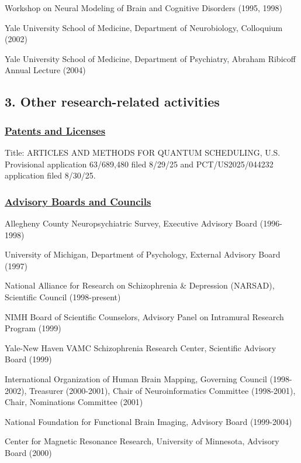 \documentclass[10 pt]{article}
\begin{document}
Workshop on Neural Modeling of Brain and Cognitive Disorders (1995, 1998)

Yale University School of Medicine, Department of Neurobiology, Colloquium (2002)

Yale University School of Medicine, Department of Psychiatry, Abraham Ribicoff Annual Lecture (2004)


\subsection*{3. Other research-related activities} \label{secRAPA3}
    \smallskip

\subsubsection*{\underline{Patents and Licenses}} \label{secPaL}
    \smallskip

Title: ARTICLES AND METHODS FOR QUANTUM SCHEDULING, U.S. Provisional application 63/689,480 filed 8/29/25 and PCT/US2025/044232 application filed 8/30/25.


\subsubsection*{\underline{Advisory Boards and Councils}} \label{secABaC}
    \smallskip

Allegheny County Neuropsychiatric Survey, Executive Advisory Board (1996-1998)

University of Michigan, Department of Psychology, External Advisory Board (1997)

National Alliance for Research on Schizophrenia \& Depression (NARSAD), Scientific Council (1998-present)

NIMH Board of Scientific Counselors, Advisory Panel on Intramural Research Program (1999)

Yale-New Haven VAMC Schizophrenia Research Center, Scientific Advisory Board (1999)

International Organization of Human Brain Mapping, Governing Council (1998-2002), Treasurer (2000-2001), Chair of Neuroinformatics Committee (1998-2001), Chair, Nominations Committee (2001)

National Foundation for Functional Brain Imaging, Advisory Board (1999-2004)

Center for Magnetic Resonance Research, University of Minnesota, Advisory Board (2000)
\end{document}
